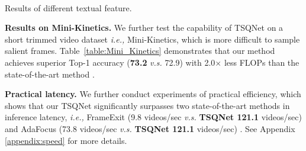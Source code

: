 \documentclass[runningheads]{llncs}
\newcommand{\tabref}[1]{Table~\ref{#1}}
\begin{document}
\begin{table*}[t]
\begin{minipage}[t]{0.45\linewidth}
\end{minipage} 
\\ \vskip 2mm
\begin{minipage}[t]{0.45\linewidth}
\caption{Results of different textual feature.}
\label{table:textual}
\centering
\setlength{\tabcolsep}{6.0pt}
\renewcommand{\arraystretch}{1.15}
\end{minipage}
\hfill
\begin{minipage}[t]{0.45\linewidth}
\centering
\caption{Impacts of initialization of TSQ embedding.}
\label{table:init}
\setlength{\tabcolsep}{3.0pt}
\renewcommand{\arraystretch}{1.15}
\end{minipage}

\end{table*}





 
\noindent\textbf{Results on Mini-Kinetics.}
We further test the capability of TSQNet on a short trimmed video dataset \emph{i.e.,} Mini-Kinetics, which is more difficult to sample salient frames.
\tabref{table:Mini_Kinetics} demonstrates that our method achieves superior Top-1 accuracy (\textbf{73.2} \emph{v.s.} 72.9) with 2.0$\times$ less FLOPs than the state-of-the-art method \cite{adafocus}.

\noindent\textbf{Practical latency.}
We further conduct experiments of practical efficiency, which shows that our TSQNet significantly surpasses two state-of-the-art methods in inference latency, \emph{i.e.,} FrameExit \cite{frameexit} (9.8 videos/sec \emph{v.s.} \textbf{TSQNet 121.1} videos/sec) and AdaFocus \cite{adafocus} (73.8 videos/sec \emph{v.s.} \textbf{TSQNet 121.1} videos/sec) \footnotemark[1]. See Appendix \ref{appendix:speed} for more details.
\end{document}
